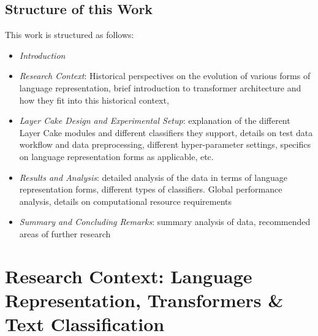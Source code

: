 \documentclass[final]{clv2025}
\begin{document}
\subsection{Structure of this Work}
This work is structured as follows:
\begin{itemize}
	\setlength\itemsep{2pt} 
    \item \textit{Introduction}
    \item \textit{Research Context}: Historical perspectives on the evolution of various forms of language representation, brief introduction to transformer architecture and how they fit into this historical context, 
    \item \textit{Layer Cake Design and Experimental Setup}: explanation of the different Layer Cake modules and different classifiers they support, details on test data workflow and data preprocessing, different hyper-parameter settings, specifics on language representation forms as applicable, etc.  
    \item \textit{Results and Analysis}: detailed analysis of the data in terms of language representation forms, different types of classifiers. Global performance analysis, details on computational resource requirements
    \item \textit{Summary and Concluding Remarks}: summary analysis of data, recommended areas of further research
\end{itemize}


\section{Research Context: Language Representation, Transformers \& Text Classification}
\end{document}
